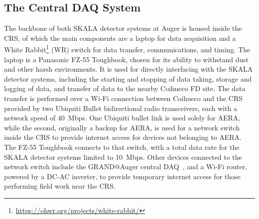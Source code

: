 \subsection{The Central DAQ System}\label{ssec:skala_central_daq}
The backbone of both SKALA detector systems at Auger is housed inside the CRS, of which the main components are a laptop for data acquisition and a White Rabbit\footnote[1]{\href{https://ohwr.org/projects/white-rabbit/}{https://ohwr.org/projects/white-rabbit/}} (WR) switch for data transfer, communications, and timing.
The laptop is a Panasonic FZ-55 Toughbook, chosen for its ability to withstand dust and other harsh environments.
It is used for directly interfacing with the SKALA detector systems, including the starting and stopping of data taking, storage and logging of data, and transfer of data to the nearby Coihueco FD site.
The data transfer is performed over a Wi-Fi connection between Coihueco and the CRS provided by two Ubiquiti Bullet bidirectional radio transceivers, each with a network speed of \qty{40}{Mbps}.
One Ubiquiti bullet link is used solely for AERA, while the second, originally a backup for AERA, is used for a network switch inside the CRS to provide internet access for devices not belonging to AERA.
The FZ-55 Toughbook connects to that switch, with a total data rate for the SKALA detector systems limited to \qty{10}{Mbps}.
Other devices connected to the network switch include the GRAND@Auger central DAQ~\cite{grand_jinst2025_prototypes}, and a Wi-Fi router, powered by a DC-AC inverter, to provide temporary internet access for those performing field work near the CRS.

